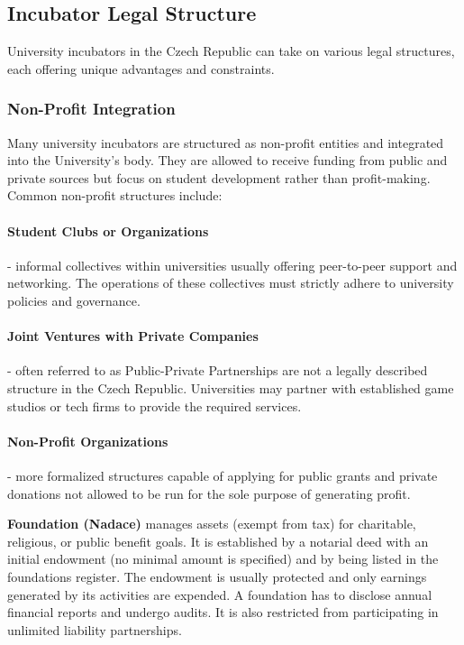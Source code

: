 \subsection{Incubator Legal Structure}
University incubators in the Czech Republic can take on various legal structures, each offering unique advantages and constraints.

\subsubsection{Non-Profit Integration}
Many university incubators are structured as non-profit entities and integrated into the University's body. They are allowed to receive funding from public and private sources but focus on student development rather than profit-making. Common non-profit structures include:
\paragraph{Student Clubs or Organizations} - informal collectives within universities usually offering peer-to-peer support and networking. The operations of these collectives must strictly adhere to university policies and governance.
\paragraph{Joint Ventures with Private Companies} - often referred to as Public-Private Partnerships are not a legally described structure in the Czech Republic. Universities may partner with established game studios or tech firms to provide the required services.
\paragraph{Non-Profit Organizations} - more formalized structures capable of applying for public grants and private donations not allowed to be run for the sole purpose of generating profit.

 \textbf{Foundation (Nadace)} manages assets (exempt from tax) for charitable, religious, or public benefit goals. It is established by a notarial deed with an initial endowment (no minimal amount is specified) and by being listed in the foundations register. The endowment is usually protected and only earnings generated by its activities are expended. A foundation has to disclose annual financial reports and undergo audits. It is also restricted from participating in unlimited liability partnerships.


